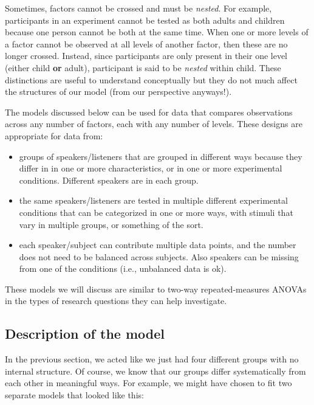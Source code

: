 \documentclass[
]{book}
\begin{document}
Sometimes, factors cannot be crossed and must be \emph{nested}. For example, participants in an experiment cannot be tested as both adults and children because one person cannot be both at the same time. When one or more levels of a factor cannot be observed at all levels of another factor, then these are no longer crossed. Instead, since participants are only present in their one level (either child \textbf{or} adult), participant is said to be \emph{nested} within child. These distinctions are useful to understand conceptually but they do not much affect the structures of our model (from our perspective anyways!).

The models discussed below can be used for data that compares observations across any number of factors, each with any number of levels. These designs are appropriate for data from:

\begin{itemize}
\item
  groups of speakers/listeners that are grouped in different ways because they differ in in one or more characteristics, or in one or more experimental conditions. Different speakers are in each group.
\item
  the same speakers/listeners are tested in multiple different experimental conditions that can be categorized in one or more ways, with stimuli that vary in multiple groups, or something of the sort.
\item
  each speaker/subject can contribute multiple data points, and the number does not need to be balanced across subjects. Also speakers can be missing from one of the conditions (i.e., unbalanced data is ok).
\end{itemize}

These models we will discuss are similar to two-way repeated-measures ANOVAs in the types of research questions they can help investigate.

\hypertarget{description-of-the-model-3}{%
\subsection{Description of the model}\label{description-of-the-model-3}}

In the previous section, we acted like we just had four different groups with no internal structure. Of course, we know that our groups differ systematically from each other in meaningful ways. For example, we might have chosen to fit two separate models that looked like this:
\end{document}

